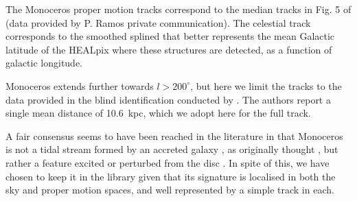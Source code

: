 The Monoceros proper motion tracks correspond to the median tracks in Fig. 5 of \citet{Ramos2021} (data provided by P. Ramos private communication). The celestial track corresponds to the smoothed splined that better represents the mean Galactic latitude of the HEALpix where these structures are detected, as a function of galactic longitude. 

Monoceros extends further towards $l>200^\circ$, but here we limit the tracks to the data provided in the blind identification conducted by \citet{Ramos2021}. The authors report a single mean distance of 10.6~kpc, which we adopt here for the full track.

A fair consensus seems to have been reached in the literature in that Monoceros is not a tidal stream formed by an accreted galaxy \citep[see review by][]{Yanny2016}, as originally thought \citep{Yanny2003}, but rather a feature excited or perturbed from the disc \citep{Kazantzidis2009,Laporte2019a,Laporte2019b}. In spite of this, we have chosen to keep it in the library given that its signature is localised in both the sky and proper motion spaces, and well represented by a simple track in each.
